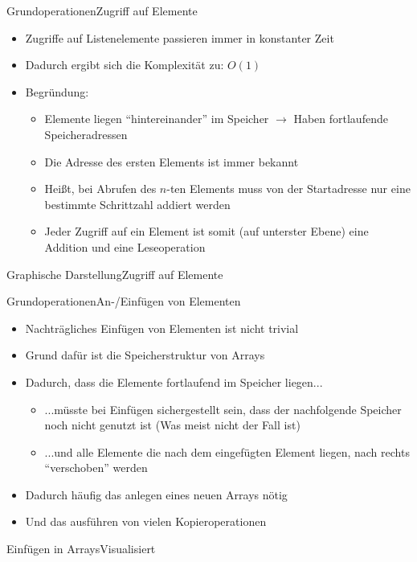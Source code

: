 \begin{frame}{Grundoperationen}{Zugriff auf Elemente}
	\begin{itemize}
		\item Zugriffe auf Listenelemente passieren immer in konstanter Zeit
		\item Dadurch ergibt sich die Komplexität zu: $O(1)$
		\item Begründung:
		\begin{itemize}
			\item Elemente liegen "`hintereinander"' im Speicher $\rightarrow$ Haben fortlaufende Speicheradressen
			\item Die Adresse des ersten Elements ist immer bekannt
			\item Heißt, bei Abrufen des $n$-ten Elements muss von der Startadresse nur eine bestimmte Schrittzahl addiert werden
			\item Jeder Zugriff auf ein Element ist somit (auf unterster Ebene) eine Addition und eine Leseoperation
		\end{itemize}
	\end{itemize}
\end{frame}


\begin{frame}{Graphische Darstellung}{Zugriff auf Elemente}
\end{frame}

\begin{frame}{Grundoperationen}{An-/Einfügen von Elementen}
	\begin{itemize}
		\item Nachträgliches Einfügen von Elementen ist nicht trivial
		\item Grund dafür ist die Speicherstruktur von Arrays
		\item Dadurch, dass die Elemente fortlaufend im Speicher liegen...
		\begin{itemize}
			\item ...müsste bei Einfügen sichergestellt sein, dass der nachfolgende Speicher noch nicht genutzt ist (Was meist nicht der Fall ist)
			\item ...und alle Elemente die nach dem eingefügten Element liegen, nach rechts "`verschoben"' werden
		\end{itemize}
		\item Dadurch häufig das anlegen eines neuen Arrays nötig
		\item Und das ausführen von vielen Kopieroperationen
	\end{itemize}
\end{frame}

\begin{frame}{Einfügen in Arrays}{Visualisiert}
\end{frame}